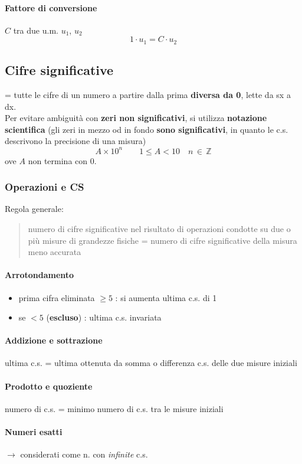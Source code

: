 \documentclass[10pt, oneside]{book}
\begin{document}
\paragraph{Fattore di conversione} $C$ tra due u.m. $u_1$, $u_2$
\[1 \cdot u_1 = C \cdot u_2\]

\subsection{Cifre significative}
= tutte le cifre di un numero a partire dalla prima \textbf{diversa da 0}, lette da sx a dx.\\
Per evitare ambiguità con \textbf{zeri non significativi}, si utilizza \textbf{notazione scientifica} (gli zeri in mezzo od in fondo \textbf{sono significativi}, in quanto le c.s. descrivono la precisione di una misura)
\[A \times 10^n \qquad 1 \leq A < 10 \quad n \, \in \, \mathbb{Z}\]
ove $A$ non termina con 0.

\subsubsection*{Operazioni e CS}
Regola generale:
\begin{quote}
numero di cifre significative nel risultato di operazioni condotte su due o più misure di grandezze fisiche = numero di cifre significative della misura meno accurata
\end{quote}
\paragraph{Arrotondamento}
\begin{itemize}
\item prima cifra eliminata $\geq 5$ : si aumenta ultima c.s. di 1
\item se $< 5$ (\textbf{escluso}) : ultima c.s. invariata
\end{itemize}
\paragraph{Addizione e sottrazione} ultima c.s. = ultima ottenuta da somma o differenza c.s. delle due misure iniziali
\paragraph{Prodotto e quoziente} numero di c.s. = minimo numero di c.s. tra le misure iniziali
\paragraph{Numeri esatti} $\rightarrow$ considerati come n. con \textit{infinite} c.s.
\end{document}

